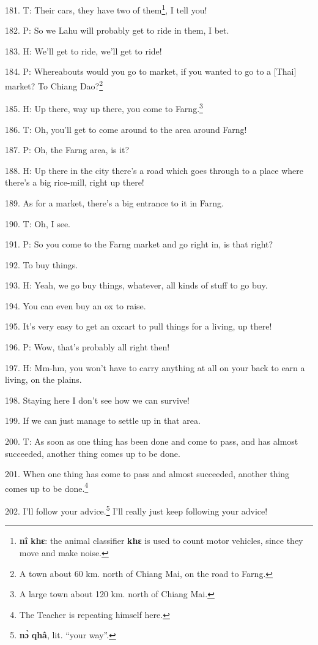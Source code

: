 181. T: Their cars, they have two of them\footnote{\textbf{nî} \textbf{khɛ}: the animal classifier \textbf{khɛ} is used to count motor vehicles, since they move and make noise.}, I tell you!

182. P: So we Lahu will probably get to ride in them, I bet.

183. H: We'll get to ride, we'll get to ride!

184. P: Whereabouts would you go to market, if you wanted to go to a [Thai] market?
To Chiang Dao?\footnote{A town about 60 km. north of Chiang Mai, on the road to Farng.}

185. H: Up there, way up there, you come to Farng.\footnote{A large town about 120 km. north of Chiang Mai.}

186. T: Oh, you'll get to come around to the area around Farng!

187. P: Oh, the Farng area, is it?

188. H: Up there in the city there's a road which goes through to a place where
there's a big rice-mill, right up there!

189. As for a market, there's a big entrance to it in Farng.

190. T: Oh, I see.

191. P: So you come to the Farng market and go right in, is that right?

192. To buy things.

193. H: Yeah, we go buy things, whatever, all kinds of stuff to go buy.

194. You can even buy an ox to raise.

195. It's very easy to get an oxcart to pull things for a living, up there!

196. P: Wow, that's probably all right then!

197. H: Mm-hm, you won't have to carry anything at all on your back to earn a living,
on the plains.

198. Staying here I don't see how we can survive!

199. If we can just manage to settle up in that area.

200. T: As soon as one thing has been done and come to pass, and has almost succeeded,
another thing comes up to be done.

201. When one thing has come to pass and almost succeeded, another thing comes
up to be done.\footnote{The Teacher is repeating himself here.}

202. I'll follow your advice.\footnote{\textbf{nɔ̀} \textbf{qhâ}, lit. ``your way''.} I'll really just keep following your advice!

